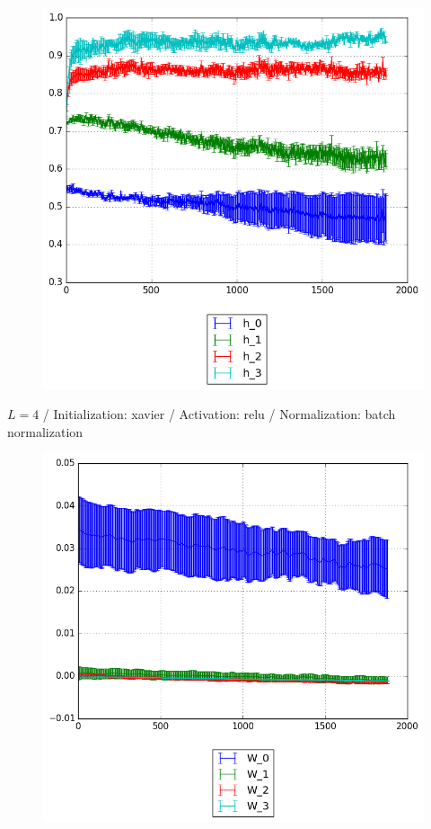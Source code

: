 \documentclass{beamer}
\begin{document}
{\begin{frame}[t]{}{}
\begin{figure}
    			\includegraphics[scale=0.4]{gfx/l4b32_relu_xavier_batch_normalization_cnn_activations}
    		\end{figure}
    		\vfill
	\end{frame}
	\begin{frame}[t]{}{}%
		\vfill
		\begin{center}
			{$L = 4$ / Initialization: xavier / Activation: relu / Normalization: batch normalization}
		\end{center}
    		\begin{figure}
    			\centering
    			\includegraphics[scale=0.4]{gfx/l4b32_relu_xavier_batch_normalization_cnn_weights}
    		\end{figure}
    		\vfill
	\end{frame}
	
}
\end{document}
